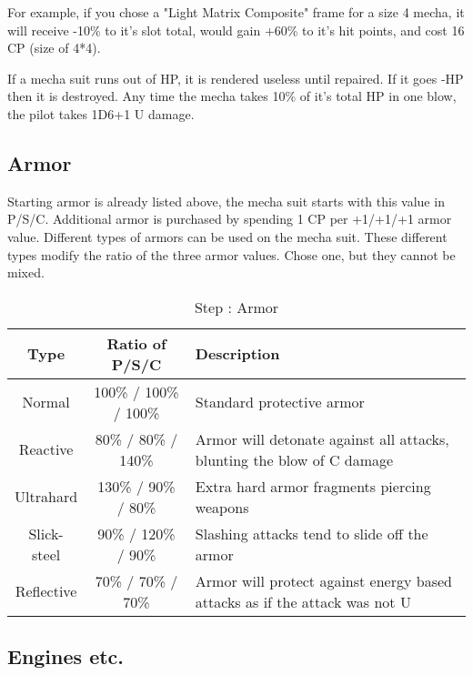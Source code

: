 For example, if you chose a "Light Matrix Composite" frame for a size 4 mecha, it will receive -10\% to it's slot total, would gain +60\% to it's hit points, and cost 16 CP (size of 4*4).

If a mecha suit runs out of HP, it is rendered useless until repaired.  If it goes -HP then it is destroyed. Any time the mecha takes 10\% of it's total HP in one blow, the pilot takes 1D6+1 U damage.

\subsection{Armor }

Starting armor is already listed above, the mecha suit starts with this value in P/S/C. Additional armor is purchased by spending 1 CP per +1/+1/+1 armor value. Different types of armors can be used on the mecha suit.  These different types modify the ratio of the three armor values.  Chose one, but they cannot be mixed.

\begin{table}[htb]
\begin{center}
\begin{tabular}{ccp{3.5in}}
\hline
Type & Ratio of P/S/C & Description \\
\hline
\hline
Normal & 100\% / 100\% / 100\%  & Standard protective armor \\ \hline
Reactive & 80\% / 80\% / 140\%  & Armor will detonate against all attacks, blunting the blow of C damage \\ \hline
Ultrahard & 130\% / 90\% / 80\%  & Extra hard armor fragments piercing weapons \\ \hline
Slick-steel & 90\% / 120\% / 90\%  & Slashing attacks tend to slide off the armor \\ \hline
Reflective & 70\% / 70\% / 70\% &  Armor will protect against energy based attacks as if the attack was not U \\ \hline
\end{tabular}
\caption{Step : Armor}
\end{center}
\end{table}
\addtocounter{MechaSteps}{1}

\subsection{Engines etc. }

